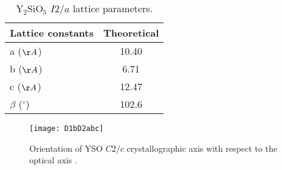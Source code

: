 \begin{table}[h]
 \begin{center}
  \caption{Y$_{2}$SiO$_{5}$ $I2/a$ lattice parameters\citep{doi:10.1021/acsami.5b00445}.}
  \label{tab:I2alatticeparam}
  \begin{tabular}{l | c}
  \hline
  Lattice constants & Theoretical\\
  \hline
  a ($\AA$) &  10.40\\
  b ($\AA$) &  6.71\\
  c ($\AA$) &  12.47\\
  $\beta$ ($^{\circ}$) &  102.6\\
  \hline
    \end{tabular}
  \end{center}
\end{table}

\begin{figure}[h]
\centering
\texttt{[image: D1bD2abc]}
\caption{\label{fig:D1bD2abc} Orientation of YSO $C2/c$ crystallographic axis with respect to the optical axis \citep{SHOUDU1999901}.}
\end{figure}




